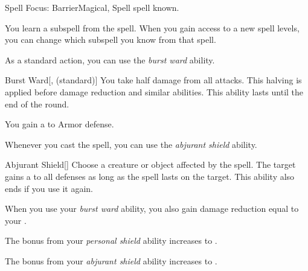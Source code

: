     \begin{feat}{Spell Focus: Barrier}{Magical, Spell}
        \featpre {} spell known.

         You learn a subspell from the  spell.
        When you gain access to a new spell levels, you can change which subspell you know from that spell.

         As a standard action, you can use the \textit{burst ward} ability.
        \begin{ability}{Burst Ward}[,  (standard)]
            You take half damage from all attacks.
            This halving is applied before damage reduction and similar abilities.
            This ability lasts until the end of the round.
        \end{ability}

         You gain a   to Armor defense.

         Whenever you cast the  spell, you can use the \textit{abjurant shield} ability.
        \begin{ability}{Abjurant Shield}[]
            Choose a creature or object affected by the spell.
            The target gains a   to all defenses as long as the spell lasts on the target.
            This ability also ends if you use it again.
        \end{ability}

         When you use your \textit{burst ward} ability, you also gain damage reduction equal to your .

         The bonus from your \textit{personal shield} ability increases to .

         The bonus from your \textit{abjurant shield} ability increases to .
    \end{feat}

